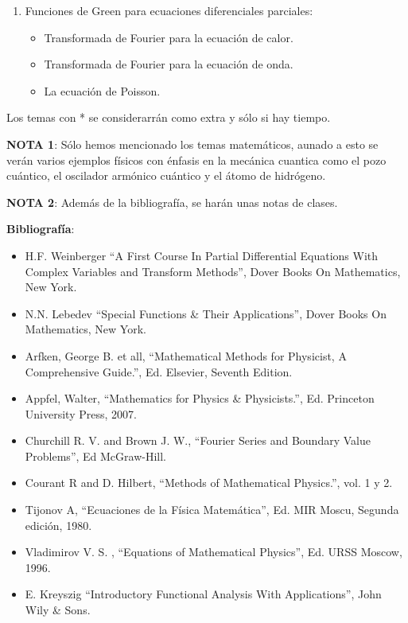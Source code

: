 \documentclass[letterpaper]{article}
\begin{document}
\begin{enumerate}
\item Funciones de Green para ecuaciones diferenciales parciales:
\begin{itemize}
\item Transformada de Fourier para la ecuación de calor.
\item Transformada de Fourier para la ecuación de onda.
\item La ecuación de Poisson.
\end{itemize}
\end{enumerate}

Los temas con * se considerarrán como extra y sólo si hay tiempo.

\textbf{NOTA 1}: Sólo hemos mencionado los temas matemáticos, aunado a esto se verán varios ejemplos físicos con énfasis en la mecánica cuantica como el pozo cuántico, el oscilador armónico cuántico y el átomo de hidrógeno.

\textbf{NOTA 2}: Además de la bibliografía, se harán unas notas de clases.\\
\vspace{1cm}


\textbf{Bibliografía}:

\begin{itemize}
\item H.F. Weinberger ``A First Course In Partial Differential Equations With Complex Variables and Transform Methods'', Dover Books On Mathematics, New York.
\item N.N. Lebedev ``Special Functions \& Their Applications'', Dover Books On Mathematics, New York.
\item Arfken, George B. et all, ``Mathematical Methods for Physicist, A Comprehensive Guide.'', Ed. Elsevier, Seventh Edition.
\item Appfel, Walter, ``Mathematics for Physics \& Physicists.'', Ed. Princeton University Press, 2007.
\item Churchill R. V. and Brown J. W., ``Fourier Series and Boundary Value Problems'', Ed McGraw-Hill.
\item Courant R and D. Hilbert, ``Methods of Mathematical Physics.'', vol. 1 y 2.
\item Tijonov A, ``Ecuaciones de la Física Matemática'', Ed. MIR Moscu, Segunda edición, 1980.
\item Vladimirov V. S. , ``Equations of Mathematical Physics'', Ed. URSS Moscow, 1996.
\item E. Kreyszig ``Introductory Functional Analysis With Applications'', John Wily \& Sons.
\end{itemize}
\end{document}
